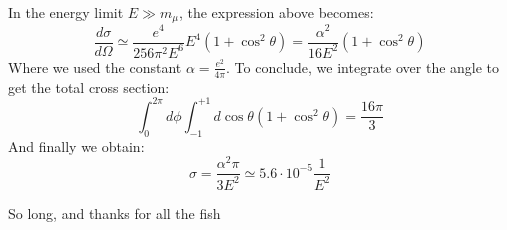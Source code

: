 \documentclass[../main.tex]{subfiles}
\begin{document}
In the energy limit $E\gg m_\mu$, the expression above becomes:
\[
\frac{d\sigma}{d\Omega}\simeq\frac{e^4}{256\pi^2E^6}E^4(1+\cos^2\theta)=\frac{\alpha^2}{16E^2}(1+\cos^2\theta)
\]
Where we used the constant $\alpha=\frac{e^2}{4\pi}$. To conclude, we integrate over the angle to get the total cross section:
\[
\int_0^{2\pi}d\phi\int_{-1}^{+1}d\cos\theta(1+\cos^2\theta)=\frac{16\pi}{3}
\]
And finally we obtain:
\[
\sigma=\frac{\alpha^2\pi}{3E^2}\simeq5.6\cdot10^{-5}\frac{1}{E^2}
\]
\newpage
\vspace*{\fill}
\begin{center}
\begin{minipage}{\textwidth}
So long, and thanks for all the fish
\end{minipage}
\end{center}
\vfill %
\end{document}
